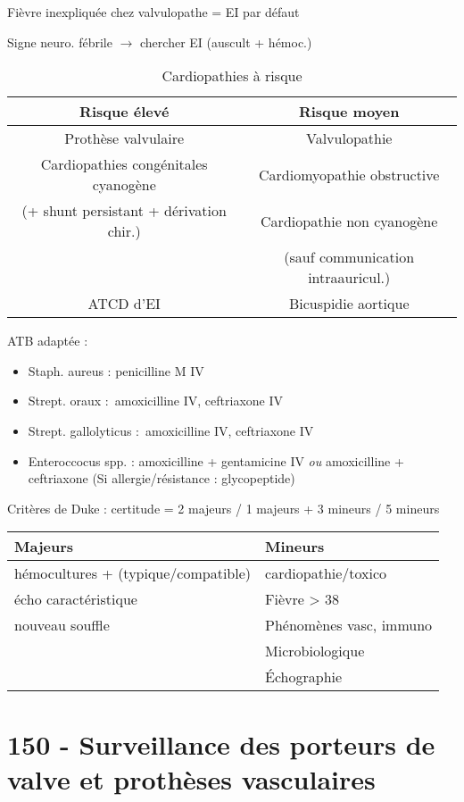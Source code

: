 \danger Fièvre inexpliquée chez valvulopathe = EI par défaut

\danger Signe neuro. fébrile $\to$ chercher EI (auscult + hémoc.)

\begin{table}[htpb]
  \centering
  \caption{Cardiopathies à risque}
  
  \begin{tabular}{cc}
    \toprule
    Risque élevé & Risque moyen \\
    \midrule
     Prothèse valvulaire & Valvulopathie\\
     Cardiopathies congénitales cyanogène & Cardiomyopathie obstructive \\
    (+ shunt persistant + dérivation chir.) & Cardiopathie non cyanogène\\
    & \quad (sauf communication intraauricul.)\\
     ATCD d'EI & Bicuspidie aortique\\
    \bottomrule
  \end{tabular}
\end{table}

ATB adaptée :

\begin{itemize}
\item
  Staph. aureus : penicilline M IV
\item
  Strept. oraux :~amoxicilline IV, ceftriaxone IV
\item
  Strept. gallolyticus :~amoxicilline IV, ceftriaxone IV
\item
  Enteroccocus spp. : amoxicilline + gentamicine IV \emph{ou}
  amoxicilline + ceftriaxone (Si allergie/résistance : glycopeptide)
\end{itemize}

Critères de Duke : certitude = 2 majeurs / 1 majeurs + 3 mineurs / 5
mineurs

\begin{longtable}[]{@{}ll@{}}
\toprule
Majeurs & Mineurs\tabularnewline
\midrule
\endhead
hémocultures + (typique/compatible) & cardiopathie/toxico\tabularnewline
écho caractéristique & Fièvre \textgreater{} 38\tabularnewline
nouveau souffle & Phénomènes vasc, immuno\tabularnewline
& Microbiologique\tabularnewline
& Échographie\tabularnewline
\bottomrule
\end{longtable}

\section{150 - Surveillance des porteurs de valve et prothèses vasculaires}

